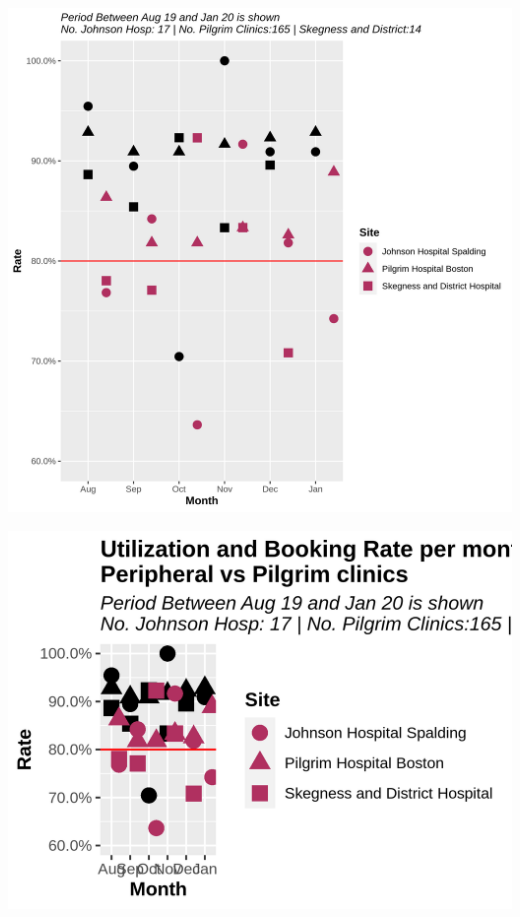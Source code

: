 \documentclass[]{article}
\begin{document}
\begin{center}\includegraphics{LF2_files/figure-latex/unnamed-chunk-9-1} \end{center}

\begin{center}\includegraphics{LF2_files/figure-latex/unnamed-chunk-10-1} \end{center}
\end{document}
